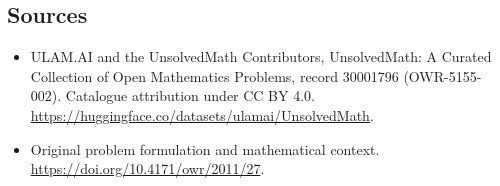 \documentclass[11pt]{article}
\begin{document}
\subsection{Sources}
\begin{itemize}
\item[\hypertarget{source:30001796:1}{S1}] ULAM.AI and the UnsolvedMath Contributors, UnsolvedMath: A Curated Collection of Open Mathematics Problems, record 30001796 (OWR-5155-002). Catalogue attribution under CC BY 4.0.
\url{https://huggingface.co/datasets/ulamai/UnsolvedMath}.
\item[\hypertarget{source:30001796:2}{S2}] Original problem formulation and mathematical context.
\url{https://doi.org/10.4171/owr/2011/27}.
\end{itemize}
\label{end:30001796}
\end{document}
